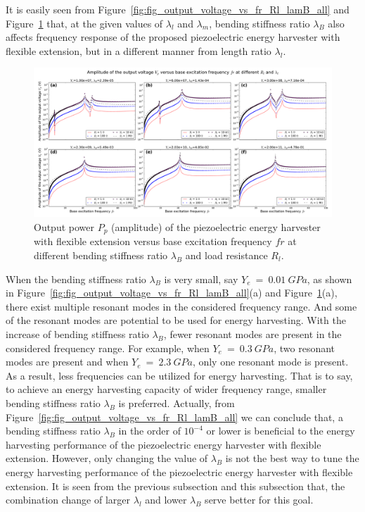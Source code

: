 \documentclass{elsarticle}
\begin{document}
It is easily seen from Figure~\ref{fig:fig_output_voltage_vs_fr_Rl_lamB_all} and Figure~\ref{fig:fig_output_power_vs_fr_Rl_lamB_all} that, at the given values of $\lambda_l$ and $\lambda_m$, bending stiffness ratio $\lambda_B$ also affects frequency response of the proposed piezoelectric energy harvester with flexible extension, but in a different manner from length ratio $\lambda_l$. 

\begin{figure}[!htbp]
    \centering
    \includegraphics[width=\textwidth]{./fig_output_power_vs_fr_Rl_lamB_all}
    \caption{Output power $P_p$ (amplitude) of the piezoelectric energy harvester with flexible extension versus base excitation frequency $fr$ at different bending stiffness ratio $\lambda_B$ and load resistance $R_l$. \color{red}{to be revised in the legend. change figure title} }
    \label{fig:fig_output_power_vs_fr_Rl_lamB_all}
\end{figure}


When the bending stiffness ratio $\lambda_B$ is very small, say $Y_e\ =\ 0.01\ GPa$, as shown in Figure~\ref{fig:fig_output_voltage_vs_fr_Rl_lamB_all}(a) and Figure~\ref{fig:fig_output_power_vs_fr_Rl_lamB_all}(a), there exist multiple resonant modes in the considered frequency range. And some of the resonant modes are potential to be used for energy harvesting. With the increase of bending stiffness ratio $\lambda_B$, fewer resonant modes are present in the considered frequency range. For example, when $Y_e\ =\ 0.3\ GPa$, two resonant modes are present and when $Y_e\ =\ 2.3\ GPa$, only one resonant mode is present. As a result, less frequencies can be utilized for energy harvesting. That is to say, to achieve an energy harvesting capacity of wider frequency range, smaller bending stiffness ratio $\lambda_B$ is preferred. Actually, from Figure~\ref{fig:fig_output_voltage_vs_fr_Rl_lamB_all} we can conclude that, a bending stiffness ratio $\lambda_B$ in the order of $10^{-4}$ or lower is beneficial to the energy harvesting performance of the piezoelectric energy harvester with flexible extension. However, only changing the value of $\lambda_B$ is not the best way to tune the energy harvesting performance of the piezoelectric energy harvester with flexible extension. It is seen from the previous subsection and this subsection that, the combination change of larger $\lambda_l$ and lower $\lambda_B$ serve better for this goal.
\end{document}
